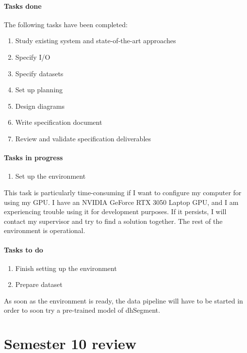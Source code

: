 \documentclass{polytech/polytech}
\numberwithin{figure}{chapter}
\begin{document}
\paragraph{Tasks done}

The following tasks have been completed:
\begin{enumerate}
\item Study existing system and state-of-the-art approaches
\item Specify I/O
\item Specify datasets
\item Set up planning
\item Design diagrams
\item Write specification document
\item Review and validate specification deliverables
\end{enumerate}

\paragraph{Tasks in progress}

\begin{enumerate}
\item Set up the environment
\end{enumerate}

This task is particularly time-consuming if I want to configure my computer for using my GPU.
I have an NVIDIA GeForce RTX 3050 Laptop GPU, and I am experiencing trouble using it for development purposes.
If it persists, I will contact my supervisor and try to find a solution together.
The rest of the environment is operational.

\paragraph{Tasks to do}

\begin{enumerate}
\item Finish setting up the environment
\item Prepare dataset
\end{enumerate}

As soon as the environment is ready, the data pipeline will have to be started in order to soon try a pre-trained model of dhSegment.

\section{Semester 10 review}
\end{document}
